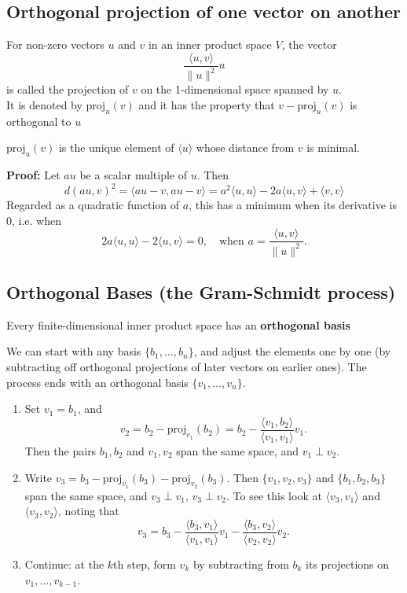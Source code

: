 \documentclass[a4paper, 9pt]{extarticle}
\begin{document}
\subsection{Orthogonal projection of one vector on another}
\begin{definitionbox}{}{}
  For non-zero vectors $u$ and $v$ in an inner product space $V$, the vector
  $$
    \frac{\langle u, v \rangle}{\|u\|^2} u
  $$
  is called the projection of $v$ on the 1-dimensional space spanned by $u$. \\
  It is denoted by $\text{proj}_u(v)$ and it has the property that $v - \text{proj}_u(v)$ is orthogonal to $u$
\end{definitionbox}
\begin{lemmabox}{}{}
  $\text{proj}_u(v)$ is the unique element of $\langle u \rangle$ whose distance from $v$ is minimal.
\end{lemmabox}
\noindent \textbf{Proof:} Let $au$ be a scalar multiple of $u$. Then
$$
  d(au, v)^2 = \langle au - v, au - v \rangle = a^2 \langle u, u \rangle - 2a \langle u, v \rangle + \langle v, v \rangle
$$
Regarded as a quadratic function of $a$, this has a minimum when its derivative is 0, i.e. when
$$
  2a \langle u, u \rangle - 2 \langle u, v \rangle = 0, \quad \text{when } a = \frac{\langle u, v \rangle}{\|u\|^2}.
$$
\subsection{Orthogonal Bases (the Gram-Schmidt process)}
\begin{conceptbox}{}{}
  Every finite-dimensional inner product space has an \textbf{orthogonal basis}
\end{conceptbox}
\noindent We can start with any basis $\{b_1, \dots, b_n\}$, and adjust the elements one by one (by subtracting off orthogonal projections of later vectors on earlier ones). The process ends with an orthogonal basis $\{v_1, \dots, v_n\}$.

\begin{enumerate}
  \item Set $v_1 = b_1$, and
        \[
          v_2 = b_2 - \text{proj}_{v_1}(b_2) = b_2 - \frac{\langle v_1, b_2 \rangle}{\langle v_1, v_1 \rangle} v_1.
        \]
        Then the pairs $b_1, b_2$ and $v_1, v_2$ span the same space, and $v_1 \perp v_2$.

  \item Write $v_3 = b_3 - \text{proj}_{v_1}(b_3) - \text{proj}_{v_2}(b_3)$.
        Then $\{v_1, v_2, v_3\}$ and $\{b_1, b_2, b_3\}$ span the same space, and $v_3 \perp v_1$, $v_3 \perp v_2$. To see this look at $\langle v_3, v_1 \rangle$ and $\langle v_3, v_2 \rangle$, noting that
        \[
          v_3 = b_3 - \frac{\langle b_3, v_1 \rangle}{\langle v_1, v_1 \rangle} v_1 - \frac{\langle b_3, v_2 \rangle}{\langle v_2, v_2 \rangle} v_2.
        \]

  \item Continue: at the $k$th step, form $v_k$ by subtracting from $b_k$ its projections on $v_1, \dots, v_{k-1}$.
\end{enumerate}
\end{document}
